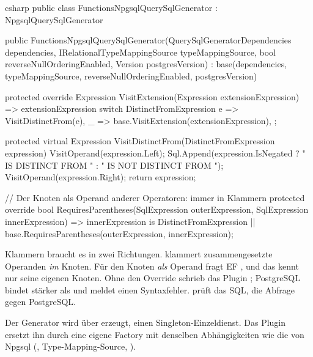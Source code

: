 \begin{sourcecode}{csharp}
public class FunctionsNpgsqlQuerySqlGenerator : NpgsqlQuerySqlGenerator
{
    public FunctionsNpgsqlQuerySqlGenerator(QuerySqlGeneratorDependencies dependencies,
        IRelationalTypeMappingSource typeMappingSource,
        bool reverseNullOrderingEnabled, Version postgresVersion)
        : base(dependencies, typeMappingSource, reverseNullOrderingEnabled, postgresVersion)
    {
    }

    protected override Expression VisitExtension(Expression extensionExpression)
        => extensionExpression switch
        {
            DistinctFromExpression e => VisitDistinctFrom(e),
            _ => base.VisitExtension(extensionExpression),
        };

    protected virtual Expression VisitDistinctFrom(DistinctFromExpression expression)
    {
        VisitOperand(expression.Left);
        Sql.Append(expression.IsNegated ? " IS DISTINCT FROM " : " IS NOT DISTINCT FROM ");
        VisitOperand(expression.Right);
        return expression;
    }

    // Der Knoten als Operand anderer Operatoren: immer in Klammern
    protected override bool RequiresParentheses(SqlExpression outerExpression,
        SqlExpression innerExpression)
        => innerExpression is DistinctFromExpression
           || base.RequiresParentheses(outerExpression, innerExpression);
}
\end{sourcecode}

Klammern braucht es in zwei Richtungen.  klammert
zusammengesetzte Operanden \emph{im} Knoten. Für den Knoten \emph{als} Operand fragt EF
, und das kennt nur seine eigenen Knoten. Ohne den
Override schrieb das Plugin
; PostgreSQL bindet \code{<>} stärker
als  und meldet einen Syntaxfehler. 
prüft das SQL,  die Abfrage gegen PostgreSQL.

Der Generator wird über
 erzeugt, einen
Singleton-Einzeldienst. Das Plugin ersetzt ihn durch eine eigene Factory mit denselben
Abhängigkeiten wie die von Npgsql
(,
Type-Mapping-Source, ).

